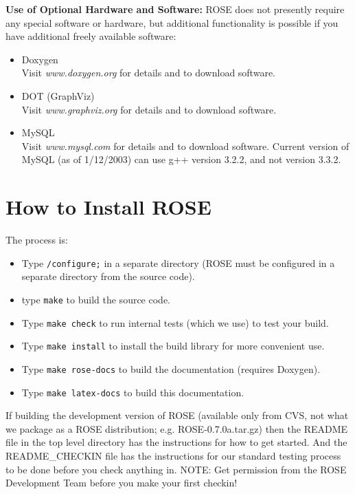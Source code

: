 {\bf Use of Optional Hardware and Software:}
   ROSE does not presently require any special software or hardware, but additional
functionality is possible if you have additional freely available software:
\begin{itemize}
   \item Doxygen \\
          Visit {\it www.doxygen.org} for details and to download software.
   \item DOT (GraphViz) \\
          Visit {\it www.graphviz.org} for details and to download software.
   \item MySQL \\
          Visit {\it www.mysql.com} for details and to download software.
          Current version of MySQL (as of 1/12/2003) can use g++ version 3.2.2, 
          and not version 3.3.2.
\end{itemize}

\section{How to Install ROSE}

   The process is:
\begin{itemize} 
   \item Type {\tt <path-to-Rose-source-code-directory>/configure;} in a separate directory
         (ROSE must be configured in a separate directory from the source code).
   \item type {\tt make} to build the source code.
   \item Type {\tt make check} to run internal tests (which we use) to test your build.  
   \item Type {\tt make install} to install the build library for more convenient use.
   \item Type {\tt make rose-docs} to build the documentation (requires Doxygen).
   \item Type {\tt make latex-docs} to build this documentation.
\end{itemize}

   If building the development version of ROSE (available only from CVS, not
what we package as a ROSE distribution; e.g. ROSE-0.7.0a.tar.gz) then the README
file in the top level directory has the instructions for how to get started. And
the README\_CHECKIN file has the instructions for our standard testing process
to be done before you check anything in.  NOTE: Get permission from the ROSE
Development Team before you make your first checkin!

